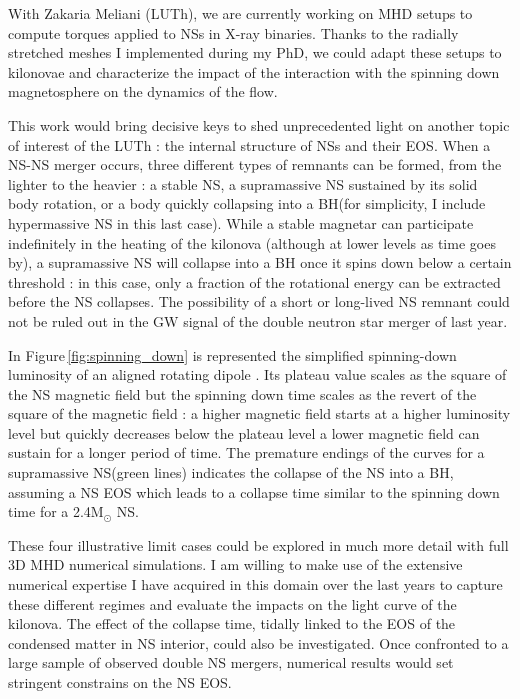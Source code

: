 \documentclass[12pt,onecolumn]{article}
\makeatletter
\newcommand{\gw}{GW\xspace}
\newcommand{\eos}{EOS\xspace}
\newcommand{\mhd}{MHD\xspace}
\newcommand*{\ns}{NS\@\xspace}
\newcommand*{\nss}{NSs\@\xspace}
\newcommand*{\bh}{BH\@\xspace}
\makeatother
\begin{document}
With Zakaria Meliani (LUTh), we are currently working on \mhd setups to compute torques applied to \nss in X-ray binaries. Thanks to the radially stretched meshes I implemented during my PhD, we could adapt these setups to kilonovae and characterize the impact of the interaction with the spinning down magnetosphere on the dynamics of the flow. 

This work would bring decisive keys to shed unprecedented light on another topic of interest of the LUTh : the internal structure of \nss and their \eos. When a \ns-\ns merger occurs, three different types of remnants can be formed, from the lighter to the heavier : a stable \ns, a supramassive \ns sustained by its solid body rotation, or a body quickly collapsing into a \bh (for simplicity, I include hypermassive \ns in this last case). While a stable magnetar can participate indefinitely in the heating of the kilonova (although at lower levels as time goes by), a supramassive \ns will collapse into a \bh once it spins down below a certain threshold : in this case, only a fraction of the rotational energy can be extracted before the \ns collapses. The possibility of a short or long-lived \ns remnant could not be ruled out in the \gw signal of the double neutron star merger of last year.

In Figure\,\ref{fig:spinning_down} is represented the simplified spinning-down luminosity of an aligned rotating dipole \citep{Spitkovsky2006,Philippov2014}. Its plateau value scales as the square of the \ns magnetic field but the spinning down time scales as the revert of the square of the magnetic field : a higher magnetic field starts at a higher luminosity level but quickly decreases below the plateau level a lower magnetic field can sustain for a longer period of time. The premature endings of the curves for a supramassive \ns (green lines) indicates the collapse of the \ns into a \bh, assuming a \ns \eos which leads to a collapse time similar to the spinning down time for a 2.4M$_{\odot}$ \ns \citep[based on][]{Metzger2015}.

These four illustrative limit cases could be explored in much more detail with full 3D \mhd numerical simulations. I am willing to make use of the extensive numerical expertise I have acquired in this domain over the last years to capture these different regimes and evaluate the impacts on the light curve of the kilonova. The effect of the collapse time, tidally linked to the \eos of the condensed matter in \ns interior, could also be investigated. Once confronted to a large sample of observed double \ns mergers, numerical results would set stringent constrains on the \ns \eos.
\end{document}
